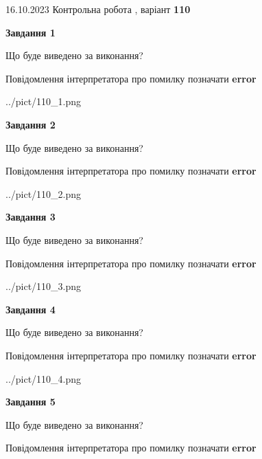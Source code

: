 \documentclass[12pt, ukrainian]{article}
\begin{document}
{\Large{16.10.2023 Контрольна робота , варіант  \No \textbf { 110 }\par}}
{
\begin {large}
{\begin {center}\textbf{Завдання 1}\end {center}}\par
Що буде виведено за виконання? \par
Повідомлення інтерпретатора про помилку позначати \textbf{error}

\begin{center}
	{../pict/110_1.png}
\end{center}
\newpage

{\begin {center}\textbf{Завдання 2}\end {center}}\par
Що буде виведено за виконання? \par
Повідомлення інтерпретатора про помилку позначати \textbf{error}

\begin{center}
	{../pict/110_2.png}
\end{center}
\newpage

{\begin {center}\textbf{Завдання 3}\end {center}}\par
Що буде виведено за виконання? \par
Повідомлення інтерпретатора про помилку позначати \textbf{error}

\begin{center}
	{../pict/110_3.png}
\end{center}
\newpage

{\begin {center}\textbf{Завдання 4}\end {center}}\par
Що буде виведено за виконання? \par
Повідомлення інтерпретатора про помилку позначати \textbf{error}

\begin{center}
	{../pict/110_4.png}
\end{center}
\newpage

{\begin {center}\textbf{Завдання 5}\end {center}}\par
Що буде виведено за виконання? \par
Повідомлення інтерпретатора про помилку позначати \textbf{error}


\end{large}}
\end{document}
